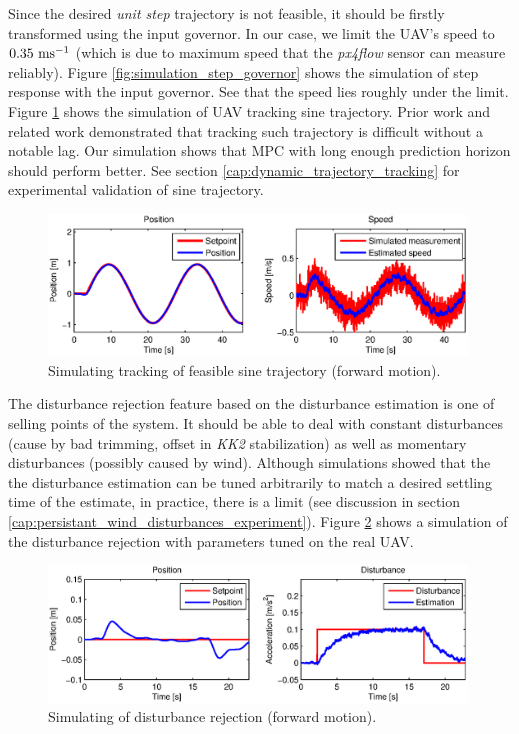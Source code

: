 Since the desired \emph{unit step} trajectory is not feasible, it should be firstly transformed using the input governor. In our case, we limit the UAV's speed to $0.35~\mathrm{ms^{-1}}$ (which is due to maximum speed that the \emph{px4flow} sensor can measure reliably). Figure \ref{fig:simulation_step_governor} shows the simulation of step response with the input governor. See that the speed lies roughly under the limit. Figure \ref{fig:simulation_sine} shows the simulation of UAV tracking sine trajectory. Prior work \citep{baca2013, endrych2014} and related work \citep{bangura2014realtimempc} demonstrated that tracking such trajectory is difficult without a notable lag. Our simulation shows that MPC with long enough prediction horizon should perform better. See section \ref{cap:dynamic_trajectory_tracking} for experimental validation of sine trajectory.

\begin{figure}[H]
\centering
\includegraphics[width=0.99\textwidth]{fig/simulation3_sine.eps}
\caption{Simulating tracking of feasible sine trajectory (forward motion).}
\label{fig:simulation_sine}
\end{figure}

The disturbance rejection feature based on the disturbance estimation is one of selling points of the system. It should be able to deal with constant disturbances (cause by bad trimming, offset in \emph{KK2} stabilization) as well as momentary disturbances (possibly caused by wind). Although simulations showed that the the disturbance estimation can be tuned arbitrarily to match a desired settling time of the estimate, in practice, there is a limit (see discussion in section \ref{cap:persistant_wind_disturbances_experiment}). Figure \ref{fig:simulation_disturbance_rejection} shows a simulation of the disturbance rejection with parameters tuned on the real UAV.

\begin{figure}[H]
\centering
\includegraphics[width=0.99\textwidth]{fig/simulation4_disturbance_rejection.eps}
\caption{Simulating of disturbance rejection (forward motion).}
\label{fig:simulation_disturbance_rejection}
\end{figure}

